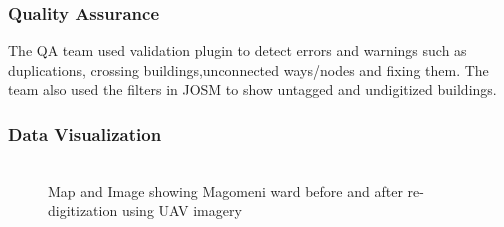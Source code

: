 \documentclass[a4paper,12pt,twoside]{article}
\begin{document}
\subsubsection{Quality Assurance}
The QA team used validation plugin to detect errors and warnings such as duplications, crossing buildings,unconnected ways/nodes and fixing them. The team also used the filters in JOSM to show untagged and undigitized buildings.

\subsubsection{Data Visualization}
 \begin{figure}[h]
 	\caption{Map and Image showing Magomeni ward before and after re-digitization using UAV imagery}
 	\centering
 	\includegraphics[width=0\textwidth]{images/Building_Footprint_Digitization.png}
 \end{figure}
\end{document}
